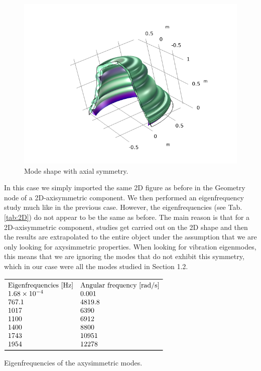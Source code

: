 \documentclass[a4paper]{article}
\begin{document}
\begin{figure}[h!]
	\centering\includegraphics[width=0.75\linewidth]{axisMode.png}
	\caption{Mode shape with axial symmetry.}
	\label{fig:ax}
\end{figure}

In this case we simply imported the same 2D figure as before in the Geometry node of a 2D-axisymmetric component. We then performed an eigenfrequency study much like in the previous case. However, the eigenfrequencies (see Tab. \ref{tab:2D}) do not appear to be the same as before. The main reason is that for a 2D-axisymmetric component, studies get carried out on the 2D shape and then the results are extrapolated to the entire object under the assumption that we are only looking for axysimmetric properties. When looking for vibration eigenmodes, this means that we are ignoring the modes that do not exhibit this symmetry, which in our case were all the modes studied in Section 1.2.

\begin{table}[h]
	\centering
	$\begin{array}{ll}
		\toprule
		\text{Eigenfrequencies [Hz]} & \text{Angular frequency [rad/s]}\\
		1.68\times 10^{-4} & 0.001 \\
		767.1 & 4819.8\\
		1017 & 6390 \\
		1100 & 6912\\
		1400 & 8800\\
		1743 & 10951 \\
		1954 & 12278\\		
		\bottomrule
	\end{array}$
	\caption{Eigenfrequencies of the axysimmetric modes.}
	\label{tab:2D}
\end{table}
\end{document}
